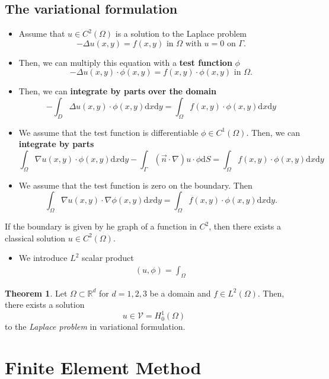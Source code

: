 \documentclass[openany,a4paper,11pt]{memoir}
\theoremstyle{definition}
\newtheorem{theorem}{Theorem}
\begin{document}
\section{The variational formulation}

\begin{itemize}
\item Assume that $u\in C^2(\Omega)$ is a solution to the Laplace problem \[-\Delta u(x,y)=f(x,y) \text{ in }\Omega\text{ with }u=0\text{ on }\Gamma.\]
\item Then, we can multiply this equation with a \textbf{test function} $\phi$ \[ -\Delta u(x,y)\cdot \phi(x,y)=f(x,y)\cdot\phi(x,y)\text{ in }\Omega.\] 
\item Then, we can \textbf{integrate by parts over the domain} \[-\int_{D}\Delta u(x,y)\cdot\phi(x,y)\mathrm{d}x\mathrm{d}y=\int_{\Omega}f(x,y)\cdot\phi(x,y)\mathrm{d}x\mathrm{d}y \]
\item We assume that the test function is differentiable $\phi\in C^1(\Omega)$. Then, we can \textbf{integrate by parts} \[\int_{\Omega}\nabla u(x,y)\cdot\phi(x,y)\mathrm{d}x\mathrm{d}y-\int_\Gamma(\vec{n}\cdot\nabla)u\cdot\phi\mathrm{d}S=\int_{\Omega}f(x,y)\cdot\phi(x,y)\mathrm{d}x\mathrm{d}y \]
\item We assume that the test function is zero on the boundary. Then \[\int_\Omega\nabla u(x,y)\cdot\nabla\phi(x,y)\mathrm{d}x\mathrm{d}y=\int_\Omega f(x,y)\cdot\phi(x,y)\mathrm{d}x\mathrm{d}y.\]
\end{itemize}

If the boundary is given by he graph of a function in $C^2$, then there exists a classical solution $u\in C^2(\Omega)$.
\begin{itemize}
\item We introduce $L^2$ scalar product
\begin{align*}
  (u,\phi)=\int_\Omega 
\end{align*}
\end{itemize}

\begin{theorem}
  Let $\Omega\subset\mathbb{R}^d$ for $d=1,2,3$ be a domain and $f\in L^2(\Omega)$. Then, there exists a solution \[ u\in\mathcal{V} = H^1_0(\Omega) \] to the \textit{Laplace problem} in variational formulation.
\end{theorem}

\chapter{Finite Element Method}
\end{document}
